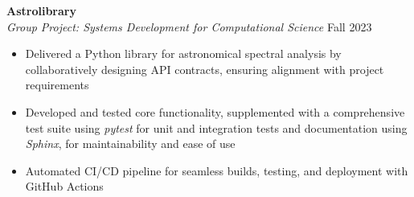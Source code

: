 \documentclass[11pt,a4paper]{article}
\newcommand{\subheading}[1]{\textbf{#1}}
\newcommand{\daterange}[1]{\hfill{#1}}
\begin{document}
\subheading{Astrolibrary} \\
\textit{Group Project: Systems Development for Computational Science} \daterange{Fall 2023}
\begin{itemize}[leftmargin=*,nosep]
    \item Delivered a Python library for astronomical spectral analysis by collaboratively designing API contracts, ensuring alignment with project requirements
    \item Developed and tested core functionality, supplemented with a comprehensive test suite using \textit{pytest} for unit and integration tests and documentation using \textit{Sphinx}, for maintainability and ease of use
    \item Automated CI/CD pipeline for seamless builds, testing, and deployment with GitHub Actions
\end{itemize}
\end{document}
